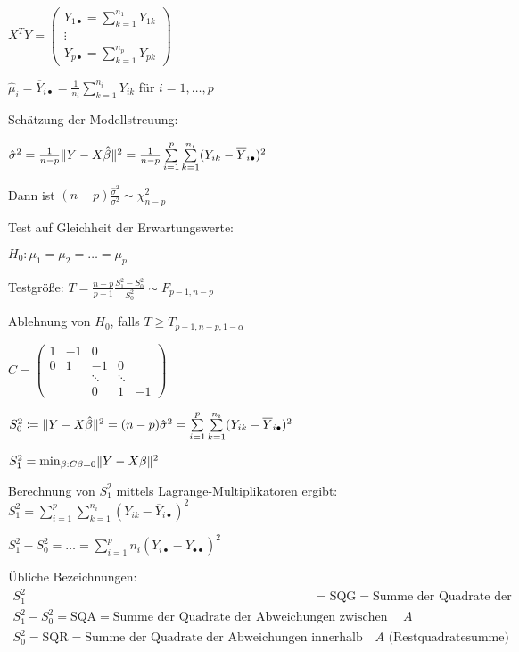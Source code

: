 \documentclass{cheat-sheet}
\begin{document}
$X^T Y = \begin{pmatrix}
  Y_{1 \bullet} = \sum_{k=1}^{n_1} Y_{1k} \\
  \vdots \\
  Y_{p \bullet} = \sum_{k=1}^{n_p} Y_{pk}
\end{pmatrix}$

$\hat{\mu}_i = \overline{Y}_{i \bullet} = \tfrac{1}{n_i} \sum_{k=1}^{n_i} Y_{ik}$ für $i = 1, \ldots, p$

Schätzung der Modellstreuung:


$\hat{\sigma}^2 = \tfrac{1}{n-p} \norm{Y - X \hat{\beta}}^2 = \tfrac{1}{n-p} \sum_{i=1}^p \sum_{k=1}^{n_i} (Y_{ik} - \overline{Y}_{i \bullet})^2$

Dann ist $(n-p) \frac{\hat{\sigma}^2}{\sigma^2} \sim \chi_{n-p}^2$

Test auf Gleichheit der Erwartungswerte:

$H_0 : \mu_1 = \mu_2 = \ldots = \mu_p$

Testgröße: $T = \tfrac{n-p}{p-1} \tfrac{S_1^2 - S_0^2}{S_0^2} \sim F_{p-1, n-p}$

Ablehnung von $H_0$, falls $T \geq T_{p-1,n-p,1-\alpha}$ %

$C = \begin{pmatrix}
  1 & -1 & 0 \\
  0 & 1 & -1 & 0 \\
  && \ddots & \ddots \\
  && 0 & 1 & -1
\end{pmatrix}$

$S_0^2 \coloneqq \norm{Y - X \hat{\beta}}^2 = (n-p) \hat{\sigma}^2 = \sum_{i=1}^p \sum_{k=1}^{n_i} (Y_{ik} - \overline{Y}_{i \bullet})^2$

$S_1^2 = \min_{\beta : C \beta = 0} \lVert Y - X \beta\rVert^2$

Berechnung von $S_1^2$ mittels Lagrange-Multiplikatoren ergibt:
$S_1^2 = \sum_{i=1}^p \sum_{k=1}^{n_i} (Y_{ik} - \overline{Y}_{i \bullet})^2$

$S_1^2 - S_0^2 = \ldots = \sum_{i=1}^p n_i (\overline{Y}_{i \bullet} - \overline{Y}_{\bullet \bullet})^2$

\begin{sprechweise}
  Übliche Bezeichnungen:
  \begin{align*}
    S_1^2 & = \text{SQG} = \text{Summe der Quadrate der Abweichungen in der Gesamtheit} \\
    S_1^2 - S_0^2 = \text{SQA} = \text{Summe der Quadrate der Abweichungen zwischen den Stufen des Faktors $A$} \\
    S_0^2 = \text{SQR} = \text{Summe der Quadrate der Abweichungen innerhalb der Stufen des Faktors $A$ (Restquadratesumme)}
  \end{align*}
\end{sprechweise}
\end{document}

